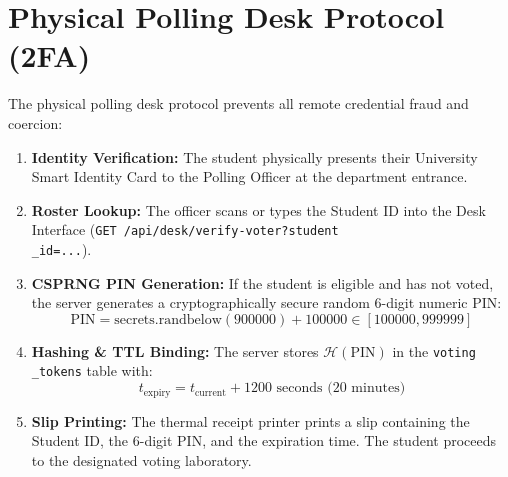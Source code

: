 \documentclass[12pt,a4paper,oneside]{report}
\begin{document}
\section{Physical Polling Desk Protocol (2FA)}
The physical polling desk protocol prevents all remote credential fraud and coercion:
\begin{enumerate}
    \item \textbf{Identity Verification:} The student physically presents their University Smart Identity Card to the Polling Officer at the department entrance.
    \item \textbf{Roster Lookup:} The officer scans or types the Student ID into the Desk Interface (\texttt{GET /api/desk/verify-voter?student\\_id=...}).
    \item \textbf{CSPRNG PIN Generation:} If the student is eligible and has not voted, the server generates a cryptographically secure random 6-digit numeric PIN:
    \begin{equation}
        \text{PIN} = \text{secrets.randbelow}(900000) + 100000 \in [100000, 999999]
    \end{equation}
    \item \textbf{Hashing \& TTL Binding:} The server stores $\mathcal{H}(\text{PIN})$ in the \texttt{voting\\_tokens} table with:
    \begin{equation}
        t_{\text{expiry}} = t_{\text{current}} + 1200\text{ seconds (20 minutes)}
    \end{equation}
    \item \textbf{Slip Printing:} The thermal receipt printer prints a slip containing the Student ID, the 6-digit PIN, and the expiration time. The student proceeds to the designated voting laboratory.
\end{enumerate}
\end{document}
